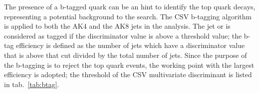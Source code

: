 The presence of a b-tagged quark can be an hint to identify the top quark decays, representing a potential background to the search. The CSV b-tagging algorithm~\cite{Chatrchyan:2012jua} is applied to both the AK4 and the AK8 jets in the analysis. The jet or is considered as tagged if the discriminator value is above a threshold value; the b-tag efficiency is defined as the number of jets which have a discriminator value that is above that cut divided by the total number of jets. Since the purpose of the b-tagging is to reject the top quark events, the working point with the largest efficiency is adopted; the threshold of the CSV multivariate discriminant is listed in tab.~\ref{tab:btag}. 

% 
% 
